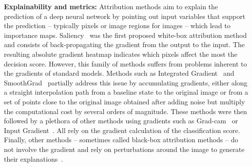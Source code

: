 \textbf{Explainability and metrics:} 
Attribution methods aim to explain the prediction of a deep neural network by pointing out input variables that support the prediction -- typically pixels or image regions for images -- which lead to importance maps.
Saliency~\cite{SimonyanVZ13} was the first proposed white-box attribution method and consists of back-propagating the gradient from the output to the input. The resulting absolute gradient heatmap indicates which pixels affect the most the decision score.
However, this family of methods suffers from problems inherent to the gradients of standard models.
Methods such as Integrated Gradient~\cite{Sundararajan2017} and SmoothGrad~\cite{Smilkov2017} partially address this issue by accumulating gradients, either along a straight interpolation path from a baseline state to the original image or from a set of points close to the original image obtained after adding noise but multiply the computational cost by several orders of magnitude.
These methods were then followed by a plethora of other methods using gradients such as Grad-cam~\cite{Selvaraju_2019} or Input Gradient~\cite{ancona18GradInput}. All rely on the gradient calculation of the classification score.
Finally, other methods -- sometimes called black-box attribution methods -- do not involve the gradient and rely on perturbations around the image to generate their explanations~\cite{petsiuk18Rise,fel21sobol}.


